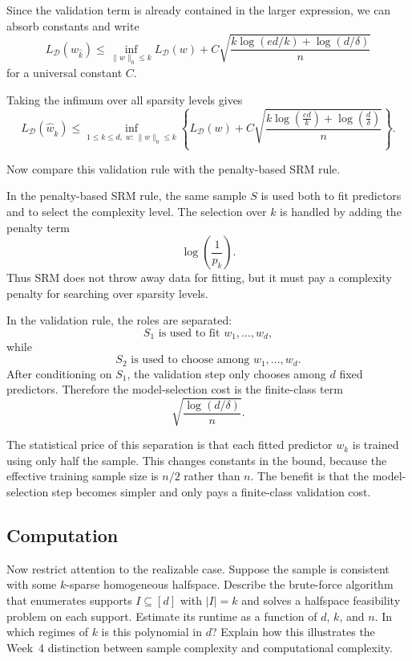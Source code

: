 \documentclass[11pt]{article}
\newcommand{\calD}{\mathcal{D}}
\begin{document}
\begin{solutionbox}
Since the validation term is already contained in the larger expression, we can absorb constants and write
\[
L_{\calD}(w_{\hat k})
\le
\inf_{\|w\|_0\le k}L_{\calD}(w)
+
C
\sqrt{
\frac{
k\log(ed/k)+\log(d/\delta)
}{
n}
}
\]
for a universal constant $C$.

Taking the infimum over all sparsity levels gives
\[
\boxed{
L_{\mathcal{D}}(\hat{w}_{\hat{k}})
\le
\inf_{1 \le k \le d,\; w:\,\|w\|_0 \le k}
\left\{
L_{\mathcal{D}}(w)
+
C \sqrt{
\frac{
k \log\!\left(\frac{ed}{k}\right)
+
\log\!\left(\frac{d}{\delta}\right)
}{
n}
}
\right\}.
}
\]

\medskip

Now compare this validation rule with the penalty-based SRM rule.

In the penalty-based SRM rule, the same sample $S$ is used both to fit predictors and to select the complexity level. The selection over $k$ is handled by adding the penalty term
\[
\log\left(\frac{1}{p_k}\right).
\]
Thus SRM does not throw away data for fitting, but it must pay a complexity penalty for searching over sparsity levels.

In the validation rule, the roles are separated:
\[
S_1 \text{ is used to fit } w_1,\dots,w_d,
\]
while
\[
S_2 \text{ is used to choose among } w_1,\dots,w_d.
\]
After conditioning on $S_1$, the validation step only chooses among $d$ fixed predictors. Therefore the model-selection cost is the finite-class term
\[
\sqrt{\frac{\log(d/\delta)}{n}}.
\]

The statistical price of this separation is that each fitted predictor $w_k$ is trained using only half the sample. This changes constants in the bound, because the effective training sample size is $n/2$ rather than $n$. The benefit is that the model-selection step becomes simpler and only pays a finite-class validation cost.

\end{solutionbox}


\subsection{Computation}
Now restrict attention to the realizable case. Suppose the sample is consistent with 
some $k$-sparse homogeneous halfspace. Describe the brute-force algorithm that enumerates 
supports $I \subseteq [d]$ with $|I| = k$ and solves a halfspace feasibility problem on each 
support. Estimate its runtime as a function of $d$, $k$, and $n$. In which regimes of $k$ is 
this polynomial in $d$? Explain how this illustrates the Week~4 distinction between sample 
complexity and computational complexity.
\end{document}
